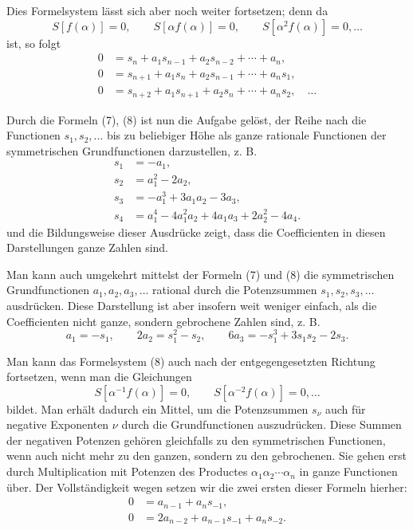 \documentclass[11pt]{article}
\begin{document}
Dies Formelsystem lässt sich aber noch weiter fortsetzen; denn da
\[
 S[f(\alpha)]=0,\qquad S[\alpha f(\alpha)]=0,\qquad S[\alpha^2 f(\alpha)]=0,\ldots
\]
ist, so folgt
\begin{equation}
\begin{aligned}
0&=s_n+a_1s_{n-1}+a_2s_{n-2}+\cdots+a_n,\\
0&=s_{n+1}+a_1s_n+a_2s_{n-1}+\cdots+a_ns_1,\\
0&=s_{n+2}+a_1s_{n+1}+a_2s_n+\cdots+a_ns_2,\quad\ldots
\end{aligned}
\tag{8}
\end{equation}

Durch die Formeln (7), (8) ist nun die Aufgabe gelöst, der Reihe nach die Functionen $s_1,s_2,\ldots$ bis zu beliebiger Höhe als ganze rationale Functionen der symmetrischen Grundfunctionen darzustellen, z. B.
\begin{equation}
\begin{aligned}
 s_1&=-a_1,\\
 s_2&=a_1^2-2a_2,\\
 s_3&=-a_1^3+3a_1a_2-3a_3,\\
 s_4&=a_1^4-4a_1^2a_2+4a_1a_3+2a_2^2-4a_4.
\end{aligned}
\tag{9}
\end{equation}
und die Bildungsweise dieser Ausdrücke zeigt, dass die Coefficienten in diesen Darstellungen ganze Zahlen sind.

Man kann auch umgekehrt mittelst der Formeln (7) und (8) die symmetrischen Grundfunctionen $a_1,a_2,a_3,\ldots$ rational durch die Potenzsummen $s_1,s_2,s_3,\ldots$ ausdrücken. Diese Darstellung ist aber insofern weit weniger einfach, als die Coefficienten nicht ganze, sondern gebrochene Zahlen sind, z. B.
\begin{equation}
 a_1=-s_1,\qquad
 2a_2=s_1^2-s_2,\qquad
 6a_3=-s_1^3+3s_1s_2-2s_3.
\tag{10}
\end{equation}

Man kann das Formelsystem (8) auch nach der entgegengesetzten Richtung fortsetzen, wenn man die Gleichungen
\[
 S[\alpha^{-1}f(\alpha)]=0,\qquad
 S[\alpha^{-2}f(\alpha)]=0,\ldots
\]
bildet. Man erhält dadurch ein Mittel, um die Potenzsummen $s_\nu$ auch für negative Exponenten $\nu$ durch die Grundfunctionen auszudrücken. Diese Summen der negativen Potenzen gehören gleichfalls zu den symmetrischen Functionen, wenn auch nicht mehr zu den ganzen, sondern zu den gebrochenen. Sie gehen erst durch Multiplication mit Potenzen des Productes $\alpha_1\alpha_2\cdots\alpha_n$ in ganze Functionen über. Der Vollständigkeit wegen setzen wir die zwei ersten dieser Formeln hierher:
\begin{equation}
\begin{aligned}
0&=a_{n-1}+a_ns_{-1},\\
0&=2a_{n-2}+a_{n-1}s_{-1}+a_ns_{-2}.
\end{aligned}
\tag{11}
\end{equation}
\end{document}
